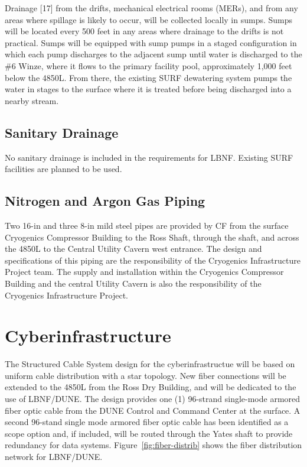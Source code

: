 Drainage [17] from the drifts, mechanical electrical rooms (MERs), and from any areas where spillage is likely to occur, will be collected locally in sumps. Sumps will be located every 500 feet in any areas where drainage to the drifts is not practical. Sumps will be equipped with sump pumps in a staged configuration in which each pump discharges to the adjacent sump until water is discharged to the \#6 Winze, where it flows to the primary facility pool, approximately 1,000 feet below the 4850L. From there, the existing SURF dewatering system pumps the water in stages to the surface where it is treated before being discharged into a nearby stream.

\subsection{Sanitary Drainage}
\label{sec:fscf-und-san-drain}

No sanitary drainage is included in the requirements for LBNF. Existing SURF facilities are planned to be used.

\subsection{Nitrogen and Argon Gas Piping}
\label{sec:fscf-und-gas-piping}

Two 16-in and three 8-in mild steel pipes are provided by CF from the surface Cryogenics Compressor Building to the Ross Shaft, through the shaft, and across the 4850L to the Central Utility Cavern west entrance. The design and specifications of this piping are the responsibility of the Cryogenics Infrastructure Project team. The supply and installation within the Cryogenics Compressor Building and the central Utility Cavern is also the responsibility of the Cryogenics Infrastructure Project.

\section{Cyberinfrastructure}
\label{sec:fscf-und-cyber}

The Structured Cable System design for the cyberinfrastructue will be based on uniform cable distribution with a star topology. New fiber connections will be extended to the 4850L from the Ross Dry Building, and will be dedicated to the use of LBNF/DUNE. The design provides one (1) 96-strand single-mode armored fiber optic cable from the DUNE Control and Command Center at the surface. %
A second 96-stand single mode armored fiber optic cable has been identified as a scope option and, if included, will be routed through the Yates shaft to provide redundancy for data systems.  Figure~\ref{fig:fiber-distrib} shows the fiber distribution network for LBNF/DUNE.

